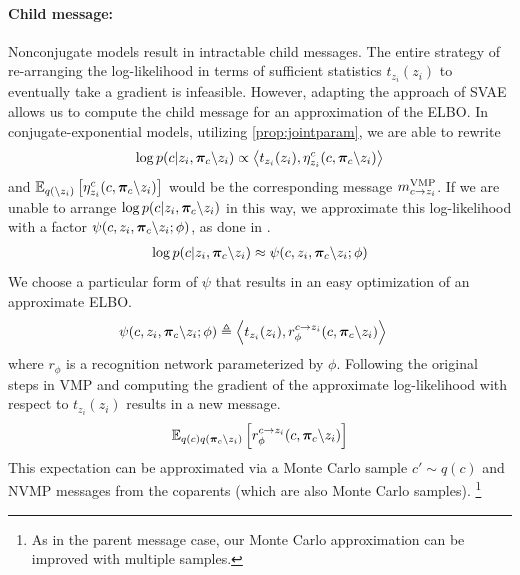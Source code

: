 \paragraph{Child message:}
Nonconjugate models result in intractable child messages.
The entire strategy of re-arranging
the log-likelihood
in terms of sufficient statistics $t_{z_i}(z_i)$ to eventually
take a gradient is infeasible.
However, adapting the approach of SVAE allows us to
compute the child message for an approximation of the ELBO.
In conjugate-exponential models, utilizing \autoref{prop:jointparam},
we are able to rewrite
\begin{equation}
\log p(c | z_i, \bm{\pi}_c \backslash z_i) \propto \left\langle t_{z_i}(z_i), \eta_{z_i}^c(c, \bm{\pi}_c \backslash z_i)\right\rangle 
\end{equation}
and $\mathbb{E}_{q(\backslash z_i)}\left[\eta_{z_i}^c(c, \bm{\pi}_c \backslash z_i)\right]$
would be the corresponding message $m^{\text{VMP}}_{c \rightarrow z_i}$.
If we are unable to arrange $\log p(c | z_i, \bm{\pi}_c \backslash z_i)$ in this way, we approximate this log-likelihood with a factor $\psi(c, z_i, \bm{\pi}_{c} \backslash z_i; \phi)$, as done in \cite{svae}.
\begin{equation}
\label{eq:rectrick}
\begin{split}
\log p(c | z_i, \bm{\pi}_c \backslash z_i) &\approx \psi(c, z_i, \bm{\pi}_{c} \backslash z_i; \phi) \\
\end{split}
\end{equation}
We choose a particular form of $\psi$ that results in an easy optimization
of an approximate ELBO.
\begin{equation}
\begin{split}
    \psi(c, z_i, \bm{\pi}_{c} \backslash z_i; \phi) &\triangleq \left\langle t_{z_i}(z_i), r^{c \rightarrow z_i}_{\phi}(c, \bm{\pi}_{c} \backslash z_i)\right\rangle
\end{split}
\end{equation}
where $r_{\phi}$ is a recognition network parameterized by $\phi$.
Following the original steps in VMP
and computing the gradient of the approximate log-likelihood
with respect to $t_{z_i}(z_i)$ results in a new message.
\begin{equation}
    \mathbb{E}_{q(c)q(\bm{\pi}_c \backslash z_i)} \left[r^{c \rightarrow z_i}_{\phi}(c, \bm{\pi}_{c}\backslash z_i)\right]
\end{equation}
This expectation can be approximated via a Monte Carlo sample $c' \sim q(c)$
and NVMP messages from the coparents (which are also Monte Carlo samples).
\footnote{As in the parent message case, our Monte Carlo approximation can
be improved with multiple samples.}

